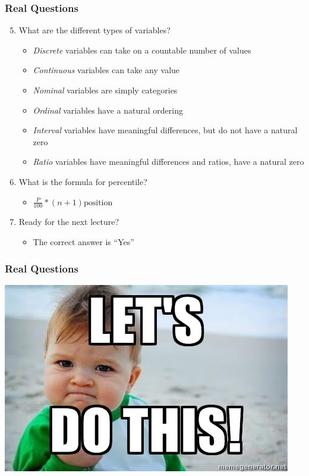 \documentclass{beamer}
\begin{document}
\begin{frame}
\frametitle{Real Questions}
    \begin{enumerate}[<+- | alert@+>]
    \setcounter{enumi}{4}
        \item What are the different types of variables?
            \begin{itemize}
                \item \textit{Discrete} variables can take on a countable number of values
                \item \textit{Continuous} variables can take any value
                \item \textit{Nominal} variables are simply categories
                \item \textit{Ordinal} variables have a natural ordering
                \item \textit{Interval} variables have meaningful differences, but do not have a natural zero
                \item \textit{Ratio} variables have meaningful differences and ratios, have a natural zero
            \end{itemize} 
            \item What is the formula for percentile?
                \begin{itemize}
                    \item $\frac{P}{100} * (n + 1) \text{position}$
                \end{itemize}
            \item Ready for the next lecture?
                \begin{itemize}
                    \item The correct answer is ``Yes''
                \end{itemize}
    \end{enumerate}
\end{frame} 

\begin{frame}
\frametitle{Real Questions}
    \centering
    \includegraphics[scale=0.75]{letsDoThis1.jpg}
\end{frame} 
\end{document}
